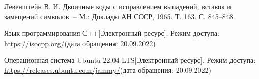 
\begin{thebibliography}{10}
	Левенштейн В. И. Двоичные коды с исправлением выпадений, вставок и замещений символов. – М.: Доклады АН СССР, 1965. Т. 163. С. 845–848.
	
	Язык программирования С++[Электронный ресурс]. Режим доступа: 
	\url{https://isocpp.org/}(дата обращения: 20.09.2022)
	
	Операционная система Ubuntu 22.04 LTS[Электронный ресурс]. Режим доступа: 
	\url{https://releases.ubuntu.com/jammy/}(дата обращения: 20.09.2022)
	
	
\end{thebibliography}





